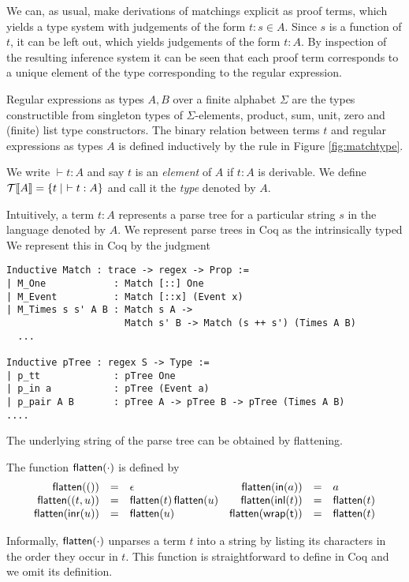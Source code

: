 We can, as usual, make derivations of matchings explicit as proof terms, which yields a type system with judgements of the form 
$t : s \in A$.  Since $s$ is a function of $t$, it can be left out, which yields judgements of the form $t : A$.  
By inspection of the resulting inference system it can be seen that each proof term corresponds to a unique element of the type corresponding to the regular expression.
\begin{definition}[Inhabitation]
Regular expressions as types $A, B$ over a finite alphabet $\Sigma$ are the types constructible from singleton types of $\Sigma$-elements,
product, sum, unit, zero and (finite) list type constructors.
The binary relation between terms $t$ and regular expressions as types $A$ is defined inductively by
the rule in Figure \ref{fig:matchtype}.

We write $\vdash t: A$ and say $t$ is an \emph{element} of $A$ if $t: A$ is derivable.
We define $\mathcal{T}\llbracket A \rrbracket = \{ t \mid \,\, \vdash t : A \}$ and call it the \emph{type} denoted by $A$.
\end{definition}
Intuitively, a term $t : A$ represents a parse tree for a particular
string $s$ in the language denoted by $A$. 
We represent parse trees in Coq as the intrinsically typed 
We represent this in Coq by the  judgment
\begin{samepage}
\begin{verbatim}
Inductive Match : trace -> regex -> Prop :=
| M_One            : Match [::] One
| M_Event          : Match [::x] (Event x)
| M_Times s s' A B : Match s A ->  
                     Match s' B -> Match (s ++ s') (Times A B)
  ...

Inductive pTree : regex S -> Type := 
| p_tt             : pTree One 
| p_in a           : pTree (Event a)
| p_pair A B       : pTree A -> pTree B -> pTree (Times A B)
....
\end{verbatim}
\end{samepage}
 The underlying string of
the parse tree can be obtained by flattening.
\begin{definition}
The function $\mathsf{flatten}(\cdot)$ is defined by
\[ \begin{array}{rclrcl}
\mathsf{flatten}(()) & = & \epsilon &
\mathsf{flatten}(\mathsf{in}(a)) & = & a \\
\mathsf{flatten}((t,u)) & = & \mathsf{flatten}(t) \, \mathsf{flatten}(u) &
\mathsf{flatten}(\mathsf{inl}(t)) & = & \mathsf{flatten}(t) \\
\mathsf{flatten}(\mathsf{inr}(u)) & = & \mathsf{flatten}(u) &
\mathsf{flatten}(\mathsf{wrap(t)}) & = & \mathsf{flatten}(t)
\end{array} \]
\end{definition}
Informally, $\mathsf{flatten}(\cdot)$ unparses a term $t$ into a string by
listing its characters in the order they occur in $t$. This function
is straightforward to define in Coq and we omit its definition. 


